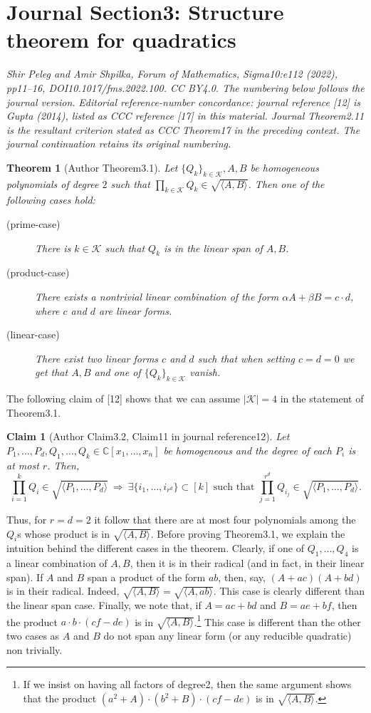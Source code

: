 \documentclass[10pt,a4paper]{article}
\newtheorem*{nttheorem}{Theorem}
\newtheorem*{ntclaim}{Claim}
\begin{document}
\section*{Journal Section3: Structure theorem for quadratics}
\textit{Shir Peleg and Amir Shpilka, Forum of Mathematics, Sigma10:e112 (2022), pp11--16, DOI10.1017/fms.2022.100. CC BY4.0. The numbering below follows the journal version.}
\noindent\textit{Editorial reference-number concordance: journal reference [12] is Gupta (2014), listed as CCC reference [17] in this material. Journal Theorem2.11 is the resultant criterion stated as CCC Theorem17 in the preceding context. The journal continuation retains its original numbering.}
\begin{nttheorem}[Author Theorem3.1]
Let $\{Q_k\}_{k\in\mathcal K},A,B$ be homogeneous polynomials of degree $2$ such that $\prod_{k\in\mathcal K}Q_k\in\sqrt{\langle A,B\rangle}$. Then one of the following cases hold:
\begin{description}
\item[(prime-case)] There is $k\in\mathcal K$ such that $Q_k$ is in the linear span of $A,B$.
\item[(product-case)] There exists a nontrivial linear combination of the form $\alpha A+\beta B=c\cdot d$, where $c$ and $d$ are linear forms.
\item[(linear-case)] There exist two linear forms $c$ and $d$ such that when setting $c=d=0$ we get that $A,B$ and one of $\{Q_k\}_{k\in\mathcal K}$ vanish.
\end{description}
\end{nttheorem}
The following claim of [12] shows that we can assume $|\mathcal K|=4$ in the statement of Theorem3.1.
\begin{ntclaim}[Author Claim3.2, Claim11 in journal reference12]
Let $P_1,\ldots,P_d,Q_1,\ldots,Q_k\in\mathbb C[x_1,\ldots,x_n]$ be homogeneous and the degree of each $P_i$ is at most $r$. Then,
\[\prod_{i=1}^kQ_i\in\sqrt{\langle P_1,\ldots,P_d\rangle}\ \Rightarrow\ \exists\{i_1,\ldots,i_{r^d}\}\subset[k]\text{ such that }\prod_{j=1}^{r^d}Q_{i_j}\in\sqrt{\langle P_1,\ldots,P_d\rangle}.\]
\end{ntclaim}
Thus, for $r=d=2$ it follow that there are at most four polynomials among the $Q_i$s whose product is in $\sqrt{\langle A,B\rangle}$.
Before proving Theorem3.1, we explain the intuition behind the different cases in the theorem. Clearly, if one of $Q_1,\ldots,Q_4$ is a linear combination of $A,B$, then it is in their radical (and in fact, in their linear span). If $A$ and $B$ span a product of the form $ab$, then, say, $(A+ac)(A+bd)$ is in their radical. Indeed, $\sqrt{\langle A,B\rangle}=\sqrt{\langle A,ab\rangle}$. This case is clearly different than the linear span case. Finally, we note that, if $A=ac+bd$ and $B=ae+bf$, then the product $a\cdot b\cdot(cf-de)$ is in $\sqrt{\langle A,B\rangle}$.\footnote{If we insist on having all factors of degree2, then the same argument shows that the product $(a^2+A)\cdot(b^2+B)\cdot(cf-de)$ is in $\sqrt{\langle A,B\rangle}$.} This case is different than the other two cases as $A$ and $B$ do not span any linear form (or any reducible quadratic) non trivially.
\end{document}

